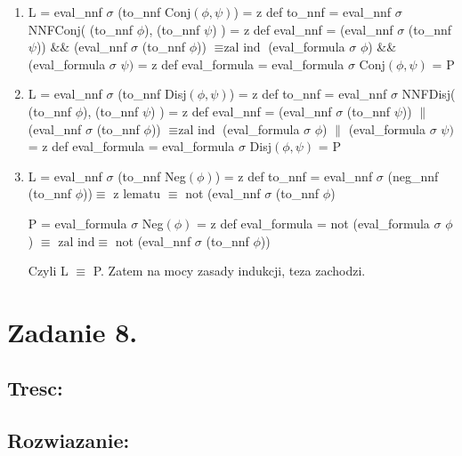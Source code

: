\documentclass{article}
\begin{document}
\begin{enumerate}[label=(\alph*)]
    \item L = eval\_nnf $\sigma$ (to\_nnf Conj$(\phi, \psi)$) = z def to\_nnf = eval\_nnf $\sigma$ NNFConj( (to\_nnf $\phi$), (to\_nnf $\psi$) ) = z def eval\_nnf = (eval\_nnf $\sigma$ (to\_nnf $\psi$)) \&\& (eval\_nnf $\sigma$ (to\_nnf $\phi$)) $\equiv \text{zal ind}$ (eval\_formula $\sigma$ $\phi$) \&\& (eval\_formula $\sigma$ $\psi)$ = z def eval\_formula = eval\_formula $\sigma$ Conj$(\phi, \psi)$ = P
    
    \item L = eval\_nnf $\sigma$ (to\_nnf Disj$(\phi, \psi)$) = z def to\_nnf = eval\_nnf $\sigma$ NNFDisj( (to\_nnf $\phi$), (to\_nnf $\psi$) ) = z def eval\_nnf = (eval\_nnf $\sigma$ (to\_nnf $\psi$)) $\|$ (eval\_nnf $\sigma$ (to\_nnf $\phi$)) $\equiv \text{zal ind}$ (eval\_formula $\sigma$ $\phi$) $\|$ (eval\_formula $\sigma$ $\psi)$ = z def eval\_formula = eval\_formula $\sigma$ Disj$(\phi, \psi)$ = P
    
    \item L = eval\_nnf $\sigma$ (to\_nnf Neg$(\phi)$) = z def to\_nnf = eval\_nnf $\sigma$ (neg\_nnf (to\_nnf $\phi$))$\equiv \text{ z lematu } \equiv$ not (eval\_nnf $\sigma$ (to\_nnf $\phi$) 

        P = eval\_formula $\sigma$ Neg$(\phi)$ = z def eval\_formula = not (eval\_formula $\sigma$ $\phi$) $\equiv \text{ zal ind} \equiv$ not (eval\_nnf $\sigma$ (to\_nnf $\phi$))
    
Czyli L $\equiv$ P. Zatem na mocy zasady indukcji, teza zachodzi.
\end{enumerate}

\section{Zadanie 8.}

\subsection{Tresc:}

\subsection{Rozwiazanie:}
\end{document}
